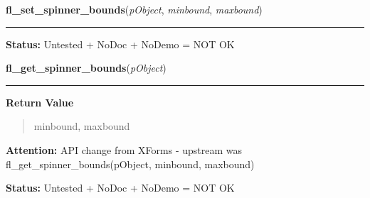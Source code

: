     \label{xformslib:library:fl_set_spinner_bounds}

    \vspace{0.5ex}

\hspace{.8\funcindent}\begin{boxedminipage}{\funcwidth}

    \raggedright \textbf{fl\_set\_spinner\_bounds}(\textit{pObject}, \textit{minbound}, \textit{maxbound})

    \vspace{-1.5ex}

    \rule{\textwidth}{0.5\fboxrule}
\setlength{\parskip}{2ex}
\setlength{\parskip}{1ex}
\textbf{Status:} Untested + NoDoc + NoDemo = NOT OK



    \end{boxedminipage}

    \label{xformslib:library:fl_get_spinner_bounds}

    \vspace{0.5ex}

\hspace{.8\funcindent}\begin{boxedminipage}{\funcwidth}

    \raggedright \textbf{fl\_get\_spinner\_bounds}(\textit{pObject})

    \vspace{-1.5ex}

    \rule{\textwidth}{0.5\fboxrule}
\setlength{\parskip}{2ex}
\setlength{\parskip}{1ex}
      \textbf{Return Value}
    \vspace{-1ex}

      \begin{quote}
      minbound, maxbound

      \end{quote}

\textbf{Attention:} API change from XForms - upstream was fl\_get\_spinner\_bounds(pObject, 
minbound, maxbound)



\textbf{Status:} Untested + NoDoc + NoDemo = NOT OK



    \end{boxedminipage}

